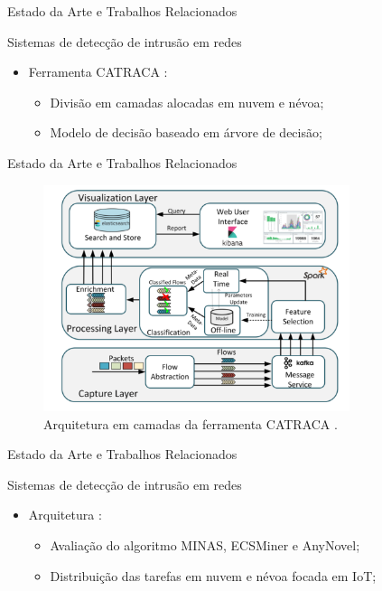 \documentclass[aspectratio=43,10pt]{beamer}
\newcommand{\nota}[1]{\hspace*{-0.5cm}\textit{{\color[rgb]{1,0,0}Nota: #1}}}
\begin{document}
\begin{frame}[fragile]{Estado da Arte e Trabalhos Relacionados}
\begin{alertblock}{Sistemas de detecção de intrusão em redes}
  \begin{itemize}
    \item Ferramenta CATRACA \cite{Lopez2018}:
    \begin{itemize}
      \item Divisão em camadas alocadas em nuvem e névoa;
      \item Modelo de decisão baseado em árvore de decisão;
    \end{itemize}
  \end{itemize}
\end{alertblock}
\end{frame}

\begin{frame}[fragile]{Estado da Arte e Trabalhos Relacionados}
\begin{figure}[ht]
  \centering
  \includegraphics[width=0.8\textwidth]{figuras/catraca-arch.png}
  \caption{Arquitetura em camadas da ferramenta CATRACA \cite{Lopez2018}.}
  \label{fig:catraca}
\end{figure}
\end{frame}


\begin{frame}[fragile]{Estado da Arte e Trabalhos Relacionados}
\begin{alertblock}{Sistemas de detecção de intrusão em redes}
  \begin{itemize}
    \item Arquitetura \arch \cite{Cassales2019a}:
    \begin{itemize}
      \item Avaliação do algoritmo MINAS, ECSMiner e AnyNovel;
      \item Distribuição das tarefas em nuvem e névoa focada em IoT;
    \end{itemize}
  \end{itemize}
\end{alertblock}
\end{frame}
\end{document}
